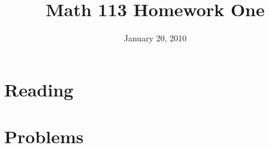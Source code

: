 \documentclass[fleqn,addpoints]{exam}
\title{Math 113 Homework One}
\author{}
\date{January 20, 2010}
\begin{document}
  \maketitle

  \section{Reading}


  \section{Problems}


\end{document}
